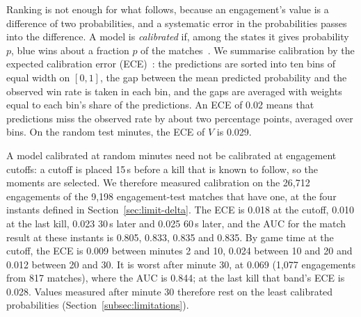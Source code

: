 Ranking is not enough for what follows, because an engagement's value is a difference of two
probabilities, and a systematic error in the probabilities passes into the difference. A model is
\emph{calibrated} if, among the states it gives probability $p$, blue wins about a fraction $p$ of the
matches~\cite{naeini2015obtaining}. We summarise calibration by the expected calibration error
(ECE)~\cite{naeini2015obtaining,guo2017calibration}: the predictions are sorted into ten bins of equal
width on $[0, 1]$, the gap between the mean predicted probability and the observed win rate is taken in
each bin, and the gaps are averaged with weights equal to each bin's share of the predictions. An ECE of
0.02 means that predictions miss the observed rate by about two percentage points, averaged over bins. On
the random test minutes, the ECE of $V$ is 0.029.

A model calibrated at random minutes need not be calibrated at engagement cutoffs: a cutoff is placed
15\,s before a kill that is known to follow, so the moments are selected. We therefore measured
calibration on the 26,712 engagements of the 9,198 engagement-test matches that have one, at the four
instants defined in Section~\ref{sec:limit-delta}. The ECE is 0.018 at the cutoff, 0.010 at the last kill,
0.023 30\,s later and 0.025 60\,s later, and the AUC for the match result at these instants is 0.805,
0.833, 0.835 and 0.835. By game time at the cutoff, the ECE is 0.009 between minutes 2 and 10, 0.024
between 10 and 20 and 0.012 between 20 and 30. It is worst after minute 30, at 0.069 (1,077 engagements
from 817 matches), where the AUC is 0.844; at the last kill that band's ECE is 0.028. Values measured
after minute 30 therefore rest on the least calibrated probabilities (Section~\ref{subsec:limitations}).

